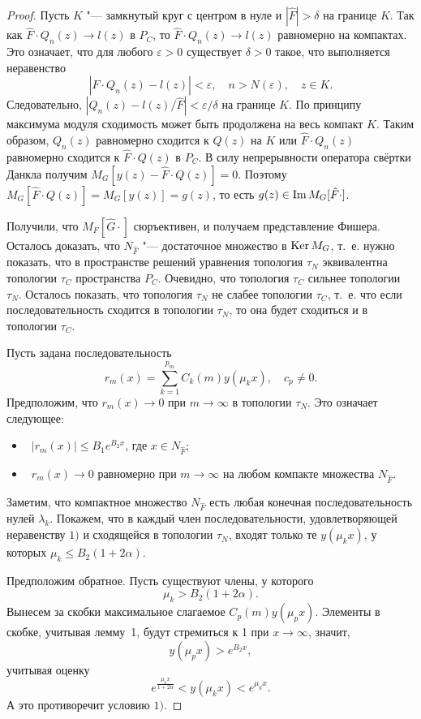 \begin{proof}
Пусть $K$ "--- замкнутый круг с центром в нуле и $|\hat F|>\delta$ на границе $K$. 
Так как $\hat F\cdot Q_n(z)\to l(z)$ в $P_C$, то $\hat F\cdot Q_n(z)\to l(z)$ равномерно на компактах. 
Это означает, что для любого $\varepsilon>0$ существует $\delta>0$ такое, что выполняется неравенство
$$|\hat F\cdot Q_n(z)-l(z)|<\varepsilon,\quad n>N(\varepsilon),\quad  z\in K.$$ 
Следовательно, $|Q_n(z)-{l(z)}/{\hat F}|<{\varepsilon}/{\delta} $ на границе $K$. 
По принципу максимума модуля сходимость может быть продолжена на весь компакт $K$. 
Таким образом, $Q_n(z)$ равномерно сходится к $Q(z)$ на $K$ или $\hat F\cdot Q_n(z)$ равномерно сходится к $\hat F\cdot Q(z)$ в $P_C$. 
В силу непрерывности оператора свёртки Данкла получим $M_G[y(z)-\hat F\cdot Q(z)]=0$. 
Поэтому $M_G[\hat F\cdot Q(z)]=M_G[y(z)]=g(z)$, то есть $g(z)\in \mathop{\rm Im} M_G[\hat F\cdot]$. 

Получили, что $M_F[\hat G\cdot]$ сюръективен, и получаем представление Фишера.
Осталось доказать, что $N_{\hat F}$ "--- достаточное множество в $\mathop{\rm Ker} M_G$, т.~е. нужно показать, что в пространстве решений уравнения топология $\tau_N$ эквивалентна топологии $\tau_C$ \cite{zabirova5} пространства $P_C$. 
Очевидно, что топология $\tau_C$ сильнее топологии $\tau_N$. 
Осталось показать, что топология $\tau_N$ не слабее топологии $\tau_C$, т.~е. что если последовательность сходится в топологии $\tau_N$, то она будет сходиться и в топологии $\tau_C$. 

Пусть задана последовательность 
$$r_m(x)=\sum\limits^{p_m}_{k=1}{C_k(m)y(\mu_kx)},\quad  c_{p}\neq 0.$$ 
Предположим, что $r_m(x)\to0$ при $m\to\infty$ в топологии $\tau_N$. 
Это означает следующее:
\begin{itemize}
\item[1)]~$|r_m(x)|\leq B_1e^{B_2x}$, где $x\in N_{\hat F}$;  
\item[2)]~$r_m(x)\to0$ равномерно при $m\to\infty$ на любом компакте множества $N_{\hat F}$. 
\end{itemize}

Заметим, что компактное множество $N_{\hat F}$ есть любая конечная последовательность нулей $\lambda_k$. Покажем, что в каждый член последовательности, удовлетворяющей неравенству $1)$ и сходящейся в топологии $\tau_N$, входят только те $y(\mu_kx)$, у которых $\mu_k\leq B_2(1+2\alpha)$.

Предположим обратное. Пусть существуют члены, у которого 
$$\mu_k>B_2(1+2\alpha).$$ 
Вынесем за скобки максимальное слагаемое $C_{p}(m)y(\mu_{p}x)$. 
Элементы в скобке, учитывая лемму~1, будут стремиться к 1 при $x\to \infty $, значит, $$y(\mu_px)>e^{B_2x} ,$$ учитывая оценку $$e^{\frac {\mu_k x}{1+2\alpha}}<y(\mu_k x)<e^{\mu_k x}.$$ 
А это противоречит условию $1)$. 


\end{proof}
